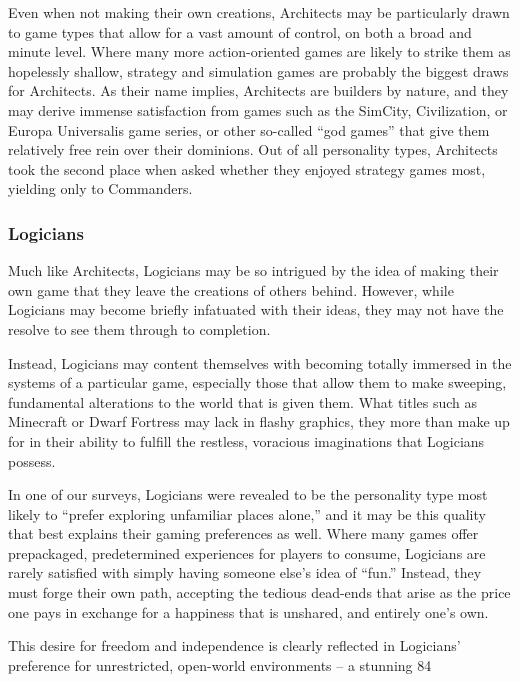 \documentclass{article}
\begin{document}
Even when not making their own creations, Architects may be particularly drawn to game types that allow for a vast amount of control, on both a broad and minute level. Where many more action-oriented games are likely to strike them as hopelessly shallow, strategy and simulation games are probably the biggest draws for Architects. As their name implies, Architects are builders by nature, and they may derive immense satisfaction from games such as the SimCity, Civilization, or Europa Universalis game series, or other so-called “god games” that give them relatively free rein over their dominions. Out of all personality types, Architects took the second place when asked whether they enjoyed strategy games most, yielding only to Commanders.
\subsubsection{Logicians}
Much like Architects, Logicians may be so intrigued by the idea of making their own game that they leave the creations of others behind. However, while Logicians may become briefly infatuated with their ideas, they may not have the resolve to see them through to completion.

Instead, Logicians may content themselves with becoming totally immersed in the systems of a particular game, especially those that allow them to make sweeping, fundamental alterations to the world that is given them. What titles such as Minecraft or Dwarf Fortress may lack in flashy graphics, they more than make up for in their ability to fulfill the restless, voracious imaginations that Logicians possess.

In one of our surveys, Logicians were revealed to be the personality type most likely to “prefer exploring unfamiliar places alone,” and it may be this quality that best explains their gaming preferences as well. Where many games offer prepackaged, predetermined experiences for players to consume, Logicians are rarely satisfied with simply having someone else’s idea of “fun.” Instead, they must forge their own path, accepting the tedious dead-ends that arise as the price one pays in exchange for a happiness that is unshared, and entirely one’s own.

This desire for freedom and independence is clearly reflected in Logicians’ preference for unrestricted, open-world environments – a stunning 84%
\end{document}
